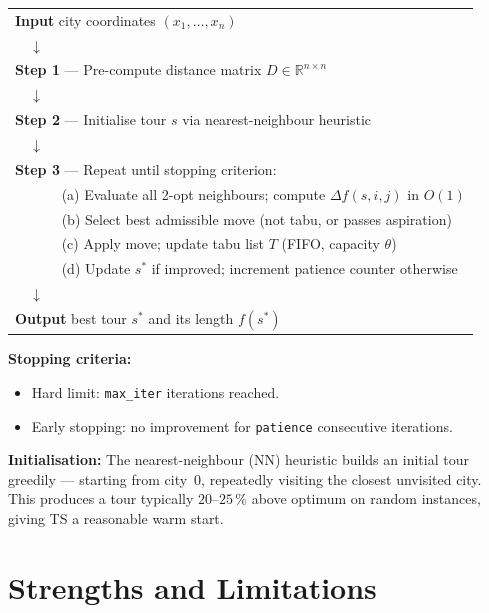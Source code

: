 \documentclass[12pt,a4paper]{article}
\begin{document}
\begin{center}
\begin{tabularx}{\linewidth}{X}
\textbf{Input} city coordinates $(x_1, \dots, x_n)$\\
$\quad\downarrow$\\
\textbf{Step 1} --- Pre-compute distance matrix $D \in \mathbb{R}^{n \times n}$\\
$\quad\downarrow$\\
\textbf{Step 2} --- Initialise tour $s$ via nearest-neighbour heuristic\\
$\quad\downarrow$\\
\textbf{Step 3} --- Repeat until stopping criterion:\\
$\quad\quad\quad$ (a) Evaluate all 2-opt neighbours; compute $\Delta f(s, i, j)$ in $O(1)$\\
$\quad\quad\quad$ (b) Select best admissible move (not tabu, or passes aspiration)\\
$\quad\quad\quad$ (c) Apply move; update tabu list $T$ (FIFO, capacity $\theta$)\\
$\quad\quad\quad$ (d) Update $s^*$ if improved; increment patience counter otherwise\\
$\quad\downarrow$\\
\textbf{Output} best tour $s^*$ and its length $f(s^*)$\\
\end{tabularx}
\end{center}

\textbf{Stopping criteria:}
\begin{itemize}[leftmargin=1.5em]
  \item Hard limit: \texttt{max\_iter} iterations reached.
  \item Early stopping: no improvement for \texttt{patience} consecutive
    iterations.
\end{itemize}

\textbf{Initialisation:}
The nearest-neighbour (NN) heuristic builds an initial tour greedily ---
starting from city~0, repeatedly visiting the closest unvisited city.
This produces a tour typically $20$--$25\,\%$ above optimum on random
instances, giving TS a reasonable warm start.

\section{Strengths and Limitations}
\end{document}
